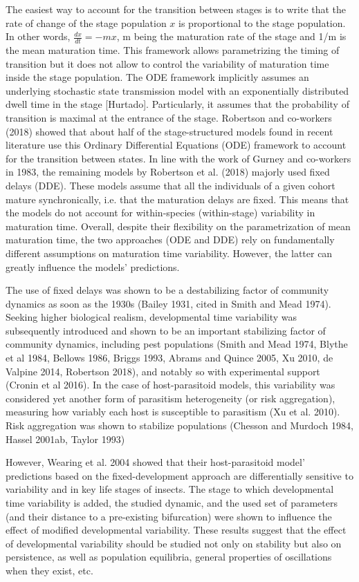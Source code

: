 \documentclass[12pt,a4paper,onecolumn]{article}
\begin{document}
\tabto{1 cm}The easiest way to account for the transition between stages is to write that the rate of change of the stage population $x$ is proportional to the stage population.  In other words, $\frac{dx}{dt} = -mx$, m being the maturation rate of the stage and 1/m is the mean maturation time. This framework allows parametrizing the timing of transition but it does not allow to control the variability of maturation time inside the stage population. The ODE framework implicitly assumes an underlying stochastic state transmission model with an exponentially distributed dwell time in the stage [Hurtado]. Particularly, it assumes that the probability of transition is maximal at the entrance of the stage. Robertson and co-workers (2018) showed that about half of the stage-structured models found in recent literature use this Ordinary Differential Equations (ODE) framework to account for the transition between states. In line with the work of Gurney and co-workers in 1983, the remaining models by Robertson et al. (2018) majorly used fixed delays (DDE). These models assume that all the individuals of a given cohort mature synchronically, i.e. that the maturation delays are fixed. This means that the models do not account for within-species (within-stage) variability in maturation time.  Overall, despite their flexibility on the parametrization of mean maturation time, the two approaches (ODE and DDE)  rely on fundamentally different assumptions on maturation time variability. However, the latter can greatly influence the models' predictions. 

\tabto{1 cm} The use of fixed delays was shown to be a destabilizing factor of community dynamics as soon as the 1930s (Bailey 1931, cited in Smith and Mead 1974). Seeking higher biological realism, developmental time variability was subsequently introduced and shown to be an important stabilizing factor of community dynamics, including pest populations (Smith and Mead 1974, Blythe et al 1984, Bellows 1986, Briggs 1993, Abrams and Quince 2005, Xu 2010, de Valpine 2014, Robertson 2018), and notably so with experimental support (Cronin et al 2016). In the case of host-parasitoid models, this variability was considered yet another form of parasitism heterogeneity (or risk aggregation), measuring how variably each host is susceptible to parasitism (Xu et al. 2010). Risk aggregation was shown to stabilize populations (Chesson and Murdoch 1984, Hassel 2001ab, Taylor 1993)

\tabto{1 cm} However, Wearing et al. 2004 showed that their host-parasitoid model' predictions based on the fixed-development approach are differentially sensitive to variability and in key life stages of insects. The stage to which developmental time variability is added, the studied dynamic, and the used set of parameters (and their distance to a pre-existing bifurcation) were shown to influence the effect of modified developmental variability. These results suggest that the effect of developmental variability should be studied not only on stability but also on persistence, as well as population equilibria, general properties of oscillations when they exist, etc. 
\end{document}
